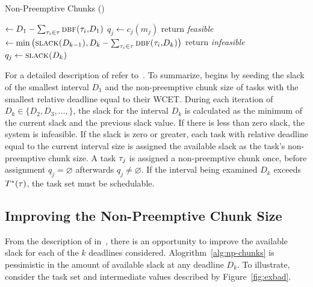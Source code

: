 \documentclass[a4paper,UKenglish,cleveref,autoref,english]{lipics-v2019}
\begin{document}
\begin{algorithm}[H]
  \caption{Non-Preemptive Chunks (\npchunks{})}\label{alg:np-chunks}
  \begin{algorithmic}[1]
    \State {} ${\gets D_{1} - \sum_{\tau_{i}
        \in \tau{}}\text{\sc{dbf}(\ensuremath{\tau_{i}},\ensuremath{D_{1}})}}$ \label{line:D1}
    \label{line:npchunks-init-start}
        \State ${q_j \gets c_j(m_j)}$
    \EndFor
    \label{line:npchunks-init-end}        
        \State return \emph{feasible}
      \EndIf
      \State {} ${\gets \min
        \left(
          \text{\sc{slack}(${D_{k-1}}$)}, D_k - \sum_{\tau_{i} \in \tau}
          \text{\sc{dbf}(\ensuremath{\tau_{i}},${D_k}$)} \label{line:slackDk}
        \right)
        }$
        \State return \emph{infeasible}
      \EndIf
          \State ${q_j \gets \text{\sc{slack}(${D_k}$)}}$
      \EndFor
    \EndFor
  \end{algorithmic}
\end{algorithm}

For a detailed description of \npchunks{} refer
to~\cite{Baruah:2005}. To summarize, \npchunks{} begins by seeding the
slack of the smallest interval ${D_1}$ and the non-preemptive chunk
size of tasks with the smallest relative deadline equal to their
WCET. During each iteration of ${D_k \in \{D_2, D_3, ..., \}}$, the
slack for the interval ${D_k}$ is calculated as the minimum of the
current slack and the previous slack value. If there is less than zero
slack, the system is infeasible. If the slack is zero or greater, each
task with relative deadline equal to the current interval size is
assigned the available slack as the task's non-preemptive chunk
size. A task ${\tau_{j}}$ is assigned a non-preemptive chunk once,
before assignment ${q_j = \varnothing}$ afterwards ${q_j \not = 
  \varnothing}$. If the interval being examined ${D_k}$ exceeds
${T^*(\tau{})}$, the task set must be schedulable.  

\subsection{Improving the Non-Preemptive Chunk Size}
\label{sec:improve-np-chunk}

From the description of \npchunks{} in~\cite{Baruah:2005}, there is
an opportunity to improve the available slack for each of the ${k}$
deadlines considered. Alogrithm~\ref{alg:np-chunks} is pessimistic in
the amount of available slack at any deadline ${D_k}$. To illustrate,
consider the task set and intermediate values described by
Figure~\ref{fig:exbad}. 
\end{document}

